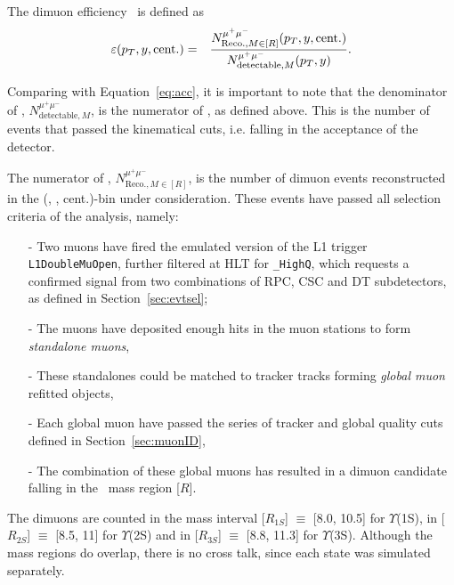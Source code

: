 The dimuon efficiency \eff\ is defined as
\begin{eqnarray}
\varepsilon(p_{T},y,\textrm{cent.}) & = &
\frac{N^{\mu^{+}\mu^{-}}_{\textrm{Reco.}, M \in [R]}(p_{T},y,\textrm{cent.})}{N^{\mu^{+}\mu^{-}}_{\textrm{detectable},M}(p_{T},y)}. 
\label{eq:efficiency}
\end{eqnarray}


Comparing with Equation~\ref{eq:acc}, it is important to note that the
denominator of \eff, $N^{\mu^{+}\mu^{-}}_{\textrm{detectable},M}$, is
the numerator of \acc, as defined above. This is the number of events
that passed the kinematical cuts, i.e. falling in the acceptance of
the detector.

The numerator of \eff,
$N^{\mu^{+}\mu^{-}}_{\textrm{Reco.}, M \in [R]}$, is the number of
dimuon events reconstructed in the (\pt, \y, cent.)-bin under
consideration. These events have passed all selection criteria of the
analysis, namely:
\begin{itemize}
\item[-]Two muons have fired the emulated version of the L1 trigger
 \verb?L1DoubleMuOpen?, further filtered at HLT for \verb?_HighQ?,
 which requests a confirmed signal from two combinations of RPC, CSC
 and DT subdetectors, as defined in Section~\ref{sec:evtsel};
\item[-]The muons have deposited enough hits in the muon stations to form
  \textit{standalone muons},
\item[-]These standalones could be matched to tracker tracks forming
  \textit{global muon} refitted objects,
\item[-]Each global muon have passed the series of tracker and global
  quality cuts defined in Section~\ref{sec:muonID},
\item[-]The combination of these global muons has resulted in a dimuon candidate
  falling in the \PgU\ mass region [$R$].
\end{itemize}

The dimuons are counted in the mass interval [$R_{1S}$] $\equiv$ [8.0, 10.5] \GeVc for $\Upsilon$(1S),
in [$R_{2S}$] $\equiv$ [8.5, 11] \GeVc  for $\Upsilon$(2S) and in [$R_{3S}$]
$\equiv$ [8.8, 11.3] \GeVc for $\Upsilon$(3S). Although the mass
regions do overlap, there is no cross talk, since each state was
simulated separately.

